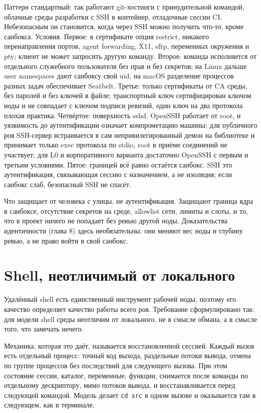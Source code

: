 \begin{warnbox}
Паттерн стандартный: так работают git-хостинги с принудительной командой, облачные среды разработки с SSH в контейнер, отладочные сессии CI. Небезопасным он становится, когда через SSH можно получить что-то, кроме санбокса. Условия. Первое: в сертификате опция restrict, никакого перенаправления портов, agent forwarding, X11, sftp, переменных окружения и pty; клиент не может запросить другую команду. Второе: команда исполняется от отдельного служебного пользователя без прав и без секретов; на Linux дальше user namespaces дают санбоксу свой uid, на macOS разделение процессов разных задач обеспечивает Seatbelt. Третье: только сертификаты от CA среды, без паролей и без ключей в файле; транспортный ключ сертифицирован ключом ноды и не совпадает с ключом подписи ревизий, один ключ на два протокола плохая практика. Четвёртое: поверхность sshd. OpenSSH работает от root, и уязвимость до аутентификации означает компрометацию машины; для публичного роя SSH-сервер встраивается в сам непривилегированный демон на библиотеке и принимает только exec протокола по stdio, root в приёме соединений не участвует; для L0 и корпоративного варианта достаточно OpenSSH с первым и третьим условиями. Пятое: границей всё равно остаётся санбокс. SSH это аутентификация, связывающая сессию с назначением, а не изоляция; если санбокс слаб, безопасный SSH не спасёт.
\end{warnbox}

Что защищает от человека с улицы, не аутентификация. Защищают граница ядра в санбоксе, отсутствие секретов на среде, allowlist сети, лимиты и слоты, и то, что в проект ничего не попадает без ревью другой ноды. Доказательства идентичности (глава 8) здесь необязательны: они меняют вес ноды и глубину ревью, а не право войти в свой санбокс.

\section{Shell, неотличимый от локального}

Удалённый shell есть единственный инструмент рабочей ноды, поэтому его качество определяет качество работы всего роя. Требование сформулировано так: для модели shell среды неотличим от локального, не в смысле обмана, а в смысле того, что замечать нечего.

Механика, которая это даёт, называется восстановленной сессией. Каждый вызов есть отдельный процесс: точный код выхода, раздельные потоки вывода, отмена по группе процессов без последствий для следующего вызова. При этом состояние сессии, каталог, переменные, функции, снимается после команды по отдельному дескриптору, мимо потоков вывода, и восстанавливается перед следующей командой. Модель делает \texttt{cd src} в одном вызове и оказывается там в следующем, как в терминале.

